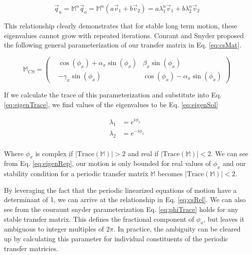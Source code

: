 \begin{equation} \label{eq:eigenRep}
	\vec{q}_n = \mathbb{M}^n\vec{q}_o = \mathbb{M}^n(a \vec{v}_1 + b \vec{v}_2) = a \lambda_1^n \vec{v}_1 + b \lambda_2^n \vec{v}_2
\end{equation}

This relationship clearly demonstrates that for stable long term motion, these eigenvalues cannot grow with repeated iterations. Courant and Snyder proposed the following general parameterization of our transfer matrix in Eq. \ref{eq:csMat}.

\begin{equation} \label{eq:csMat}
	\mathbb{M}_{CS} = 
\begin{pmatrix}
&\cos{\left(\phi_x\right)} + \alpha_x\sin{\left(\phi_x\right)} &\beta_x\sin{\left(\phi_x\right)}\\
&-\gamma_x\sin{\left(\phi_x\right)} &\cos{\left(\phi_x\right)} - \alpha_x\sin{\left(\phi_x\right)}\end{pmatrix}
\end{equation}

If we calculate the trace of this parameterization and substitute into Eq. \ref{eq:eigenTrace}, we find values of the eigenvalues to be Eq. \ref{eq:eigenSol}

\begin{equation} \label{eq:eigenSol}
\begin{split}
	\lambda_1 &= e^{i\phi_x}\\
	\lambda_2 &= e^{-i\phi_x}\\
\end{split}
\end{equation}

Where $\phi_x$ is complex if $|\mathrm{Trace}(\mathbb{M})| > 2$ and real if $|\mathrm{Trace}(\mathbb{M})| < 2$. We can see from Eq. \ref{eq:eigenRep}, our motion is only bounded for real values of $\phi_x$ and our stability condition for a periodic transfer matrix $\mathbb{M}$ becomes $|\mathrm{Trace}(\mathbb{M})| < 2$.

By leveraging the fact that the periodic linearized equations of motion have a determinant of 1, we can arrive at the relationship in Eq. \ref{eq:csRel}. We can also see from the couraunt snyder parameterization Eq. \ref{eq:phiTrace} holds for any stable transfer matrix. This defines the fractional component of $\phi_x$, but leaves it ambiguous to integer multiples of $2\pi$. In practice, the ambiguity can be cleared up by calculating this parameter for individual constituents of the periodic transfer matricies.


